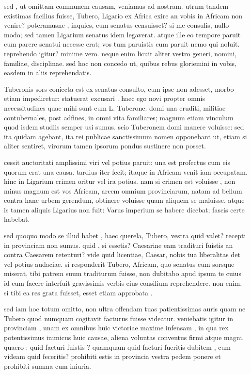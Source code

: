  sed , ut omittam communem causam, veniamus ad nostram. utrum tandem existimas facilius fuisse, Tubero, Ligario ex Africa exire an vobis in Africam non venire? poteramusne , inquies, cum senatus censuisset? si me consulis, nullo modo; sed tamen Ligarium senatus idem legaverat. atque ille eo tempore paruit cum parere senatui necesse erat; vos tum paruistis cum paruit nemo qui noluit. reprehendo igitur? minime vero. neque enim licuit aliter vestro generi, nomini, familiae, disciplinae. sed hoc non concedo ut, quibus rebus gloriemini in vobis, easdem in aliis reprehendatis.

 Tuberonis sors coniecta est ex senatus consulto, cum ipse non adesset, morbo etiam impediretur: statuerat excusari . haec ego novi propter omnis necessitudines quae mihi sunt cum L. Tuberone: domi una eruditi, militiae contubernales, post adfines, in omni vita familiares; magnum etiam vinculum quod isdem studiis semper usi sumus. scio Tuberonem domi manere voluisse: sed ita quidam agebant, ita rei publicae sanctissimum nomen opponebant ut, etiam si aliter sentiret, virorum tamen ipsorum pondus sustinere non posset.

 cessit auctoritati amplissimi viri vel potius paruit: una est profectus cum eis quorum erat una causa. tardius iter fecit; itaque in Africam venit iam occupatam. hinc in Ligarium crimen oritur vel ira potius. nam si crimen est voluisse , non minus magnum est vos Africam, arcem omnium provinciarum, natam ad bellum contra hanc urbem gerendum, obtinere voluisse quam aliquem se maluisse. atque is tamen aliquis Ligarius non fuit: Varus imperium se habere dicebat; fascis certe habebat.

 sed quoquo modo se illud habet , haec querela, Tubero, vestra quid valet? recepti in provinciam non sumus. quid , si essetis? Caesarine eam tradituri fuistis an contra Caesarem retenturi? vide quid licentiae, Caesar, nobis tua liberalitas det vel potius audaciae. si responderit Tubero, Africam, quo senatus eum sorsque miserat, tibi patrem suum traditurum fuisse, non dubitabo apud ipsum te cuius id eum facere interfuit gravissimis verbis eius consilium reprehendere. non enim, si tibi ea res grata fuisset, esset etiam approbata .

 sed iam hoc totum omitto, non ultra offendam tuas patientissimas auris quam ne Tubero quod numquam cogitavit facturus fuisse videatur. veniebatis igitur in provinciam , unam ex omnibus huic victoriae maxime infensam , in qua rex potentissimus inimicus huic causae, aliena voluntas conventus firmi atque magni. quaero : quid facturi fuistis ? quamquam quid facturi fueritis dubitem , cum videam quid feceritis? prohibiti estis in provincia vestra pedem ponere et prohibiti summa cum iniuria.

